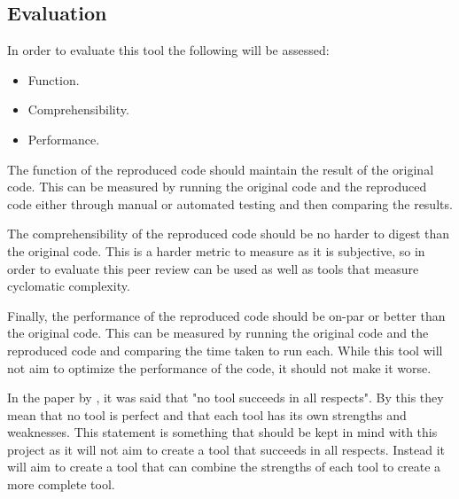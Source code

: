 \subsection{Evaluation}

In order to evaluate this tool the following will be assessed:
\begin{itemize}
	\item Function.
	\item Comprehensibility.
	\item Performance.
\end{itemize}
The function of the reproduced code should maintain the result of the original code. This can be measured by running the original code and the reproduced code either through manual or automated testing and then comparing the results.

The comprehensibility of the reproduced code should be no harder to digest than the original code. This is a harder metric to measure as it is subjective, so in order to evaluate this peer review can be used as well as tools that measure cyclomatic complexity.

Finally, the performance of the reproduced code should be on-par or better than the original code. This can be measured by running the original code and the reproduced code and comparing the time taken to run each. While this tool will not aim to optimize the performance of the code, it should not make it worse.

In the paper by \cite{8681007}, it was said that "no tool succeeds in all respects". By this they mean that no tool is perfect and that each tool has its own strengths and weaknesses. This statement is something that should be kept in mind with this project as it will not aim to create a tool that succeeds in all respects. Instead it will aim to create a tool that can combine the strengths of each tool to create a more complete tool.
